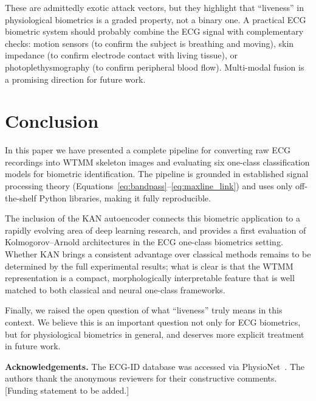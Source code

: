 \documentclass[12pt, a4paper]{article}
\begin{document}
These are admittedly exotic attack vectors, but they highlight that
``liveness'' in physiological biometrics is a graded property, not a
binary one. A practical ECG biometric system should probably combine the
ECG signal with complementary checks: motion sensors (to confirm the
subject is breathing and moving), skin impedance (to confirm electrode
contact with living tissue), or photoplethysmography (to confirm
peripheral blood flow). Multi-modal fusion is a promising direction
for future work.

\section{Conclusion}
\label{sec:conclusion}

In this paper we have presented a complete pipeline for converting raw
ECG recordings into WTMM skeleton images and evaluating six one-class
classification models for biometric identification.
The pipeline is grounded in established signal processing theory
(Equations~\ref{eq:bandpass}--\ref{eq:maxline_link}) and uses only
off-the-shelf Python libraries, making it fully reproducible.

The inclusion of the KAN autoencoder connects this biometric application
to a rapidly evolving area of deep learning research, and provides a
first evaluation of Kolmogorov--Arnold architectures in the ECG one-class
biometrics setting.
Whether KAN brings a consistent advantage over classical methods remains
to be determined by the full experimental results; what is clear is that
the WTMM representation is a compact, morphologically interpretable
feature that is well matched to both classical and neural one-class
frameworks.

Finally, we raised the open question of what ``liveness'' truly means in
this context. We believe this is an important question not only for
ECG biometrics, but for physiological biometrics in general, and
deserves more explicit treatment in future work.

\vspace{12pt}

\noindent\textbf{Acknowledgements.}
The ECG-ID database was accessed via PhysioNet~\cite{goldberger2000}.
The authors thank the anonymous reviewers for their constructive comments.
[Funding statement to be added.]
\end{document}
